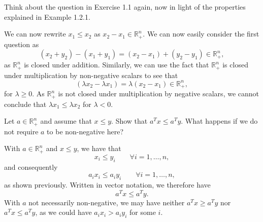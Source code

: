 \begin{exercise}
  Think about the question in Exercise 1.1 again, now in light of the properties explained in Example 1.2.1.
\end{exercise}

\begin{solution}
  We can now rewrite $x_1 \leq x_2$ as $x_2 - x_1 \in \mathbb{R}^n_+$.
  We can now easily consider the first question as
  \begin{equation}
    (x_2 + y_2) - (x_1 + y_1) = (x_2 - x_1) + (y_2 - y_1) \in \mathbb{R}^n_+,
  \end{equation}
  as $\mathbb{R}^n_+$ is closed under addition.
  Similarly, we can use the fact that $\mathbb{R}^n_+$ is closed under multiplication by non-negative scalars to see that
  \begin{equation}
    (\lambda x_2 - \lambda x_1) = \lambda (x_2 - x_1) \in \mathbb{R}^n_+,
  \end{equation}
  for $\lambda \geq 0$.
  As $\mathbb{R}^n_+$ is not closed under multiplication by negative scalars, we cannot conclude that $\lambda x_1 \leq \lambda x_2$ for $\lambda < 0$.
\end{solution}

\begin{exercise}
  Let $a \in \mathbb{R}^n_+$ and assume that $x \leq y$.
  Show that $a^T x \leq a^T y$.
  What happens if we do not require $a$ to be non-negative here?
\end{exercise}

\begin{solution}
  With $a \in \mathbb{R}^n_+$ and $x \leq y$, we have that
  \begin{equation}
    x_i \leq y_i \qquad \forall i = 1, \ldots, n,
  \end{equation}
  and consequently
  \begin{equation}
    a_i x_i \leq a_i y_i \qquad \forall i = 1, \ldots, n,
  \end{equation}
  as shown previously.
  Written in vector notation, we therefore have
  \begin{equation}
    a^T x \leq a^T y.
  \end{equation}
  With $a$ not necessarily non-negative, we may have neither $a^T x \geq a^T y$ nor $a^T x \leq a^T y$, as we could have $a_i x_i > a_i y_i$ for some $i$.
\end{solution}
